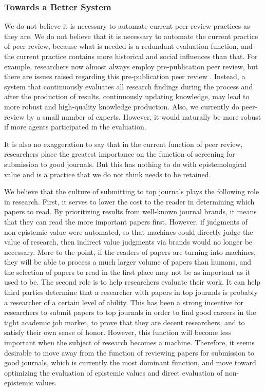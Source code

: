 \documentclass{book}
\begin{document}
\subsubsection{Towards a Better System}
We do not believe it is necessary to automate current peer review practices as they are. We do not believe that it is necessary to automate the current practice of peer review, because what is needed is a redundant evaluation function, and the current practice contains more historical and social influences than that. For example, researchers now almost always employ pre-publication peer review, but there are issues raised regarding this pre-publication peer review \cite{heesen2021peer}. Instead, a system that continuously evaluates all research findings during the process and after the production of results, continuously updating knowledge, may lead to more robust and high-quality knowledge production. Also, we currently do peer-review by a small number of experts. However, it would naturally be more robust if more agents participated in the evaluation.

It is also no exaggeration to say that in the current function of peer review, researchers place the greatest importance on the function of screening for submission to good journals. But this has nothing to do with epistemological value and is a practice that we do not think needs to be retained.

We believe that the culture of submitting to top journals plays the following role in research. First, it serves to lower the cost to the reader in determining which papers to read. By prioritizing results from well-known journal brands, it means that they can read the more important papers first. However, if judgments of non-epistemic value were automated, so that machines could directly judge the value of research, then indirect value judgments via brands would no longer be necessary. More to the point, if the readers of papers are turning into machines, they will be able to process a much larger volume of papers than humans, and the selection of papers to read in the first place may not be as important as it used to be. The second role is to help researchers evaluate their work. It can help third parties determine that a researcher with papers in top journals is probably a researcher of a certain level of ability. This has been a strong incentive for researchers to submit papers to top journals in order to find good careers in the tight academic job market, to prove that they are decent researchers, and to satisfy their own sense of honor. However, this function will become less important when the subject of research becomes a machine. Therefore, it seems desirable to move away from the function of reviewing papers for submission to good journals, which is currently the most dominant function, and move toward optimizing the evaluation of epistemic values and direct evaluation of non-epistemic values.
\end{document}
